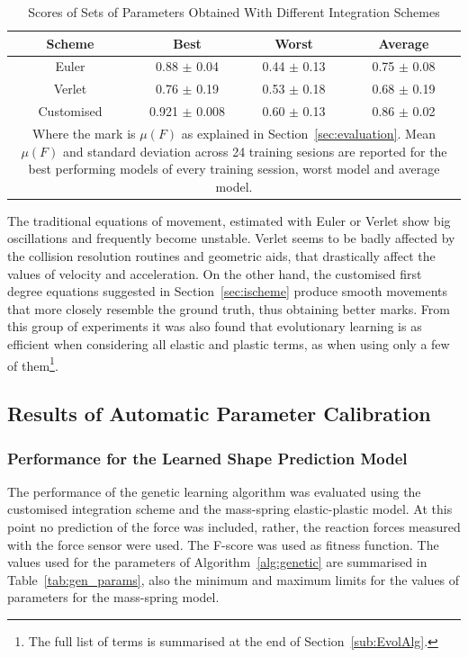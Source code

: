 \documentclass[journal]{IEEEtran}
\newcommand{\tref}[1]{Table~\ref{#1}}
\newcommand{\sref}[1]{Section~\ref{#1}}
\newcommand{\alref}[1]{Algorithm~\ref{#1}}
\newcounter{algorithm}
\begin{document}
\begin{table}[!t]
\renewcommand{\arraystretch}{1.3}
\caption{Scores of Sets of Parameters Obtained With Different Integration Schemes}
\label{tab:ischemes}
\centering
\begin{tabular}{cccc}
\hline
\bfseries Scheme & \bfseries Best & \bfseries Worst & \bfseries Average \\
\hline\hline
Euler & 0.88 $\pm$ 0.04 & 0.44 $\pm$ 0.13 & 0.75 $\pm$ 0.08 \\
Verlet & 0.76 $\pm$ 0.19 & 0.53 $\pm$ 0.18 & 0.68 $\pm$ 0.19 \\
Customised & 0.921 $\pm$ 0.008 & 0.60 $\pm$ 0.13 & 0.86 $\pm$ 0.02 \\
\hline
\multicolumn{4}{p{88mm}}{Where the mark is $\mu(F)$ as explained in \sref{sec:evaluation}.  Mean $\mu(F)$ and standard deviation across 24 training sesions are reported for the best performing models of every training session, worst model and average model.}
\end{tabular}
\end{table}

The traditional equations of movement, estimated with Euler or Verlet show big oscillations and frequently become unstable.  Verlet seems to be badly affected by the collision resolution routines and geometric aids, that drastically affect the values of velocity and acceleration.  On the other hand, the customised first degree equations suggested in \sref{sec:ischeme} produce smooth movements that more closely resemble the ground truth, thus obtaining better marks.  From this group of experiments it was also found that evolutionary learning is as efficient when considering all elastic and plastic terms, as when using only a few of them\footnote{The full list of terms is summarised at the end of \sref{sub:EvolAlg}.}.

\subsection{Results of Automatic Parameter Calibration}
\subsubsection{Performance for the Learned Shape Prediction Model}
The performance of the genetic learning algorithm was evaluated using the customised integration scheme and the mass-spring elastic-plastic model.  At this point no prediction of the force was included, rather, the reaction forces measured with the force sensor were used. The F-score was used as fitness function. The values used for the parameters of \alref{alg:genetic} are summarised in \tref{tab:gen_params}, also the minimum and maximum limits for the values of parameters for the mass-spring model.
\end{document}
